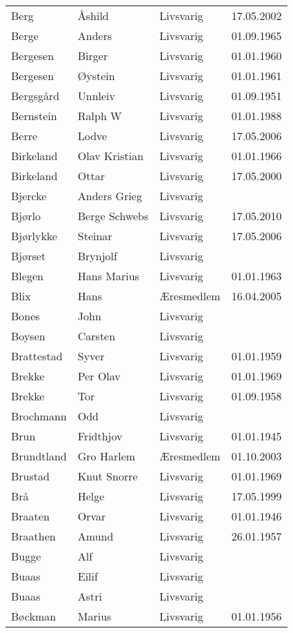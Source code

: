 \begin{longtable}{llll}
Berg 	&	Åshild	&	Livsvarig	&	17.05.2002	\\
Berge	&	Anders	&	Livsvarig 	&	01.09.1965	\\
Bergesen	&	Birger	&	Livsvarig 	&	01.01.1960	\\
Bergesen	&	Øystein	&	Livsvarig 	&	01.01.1961	\\
Bergsgård	&	Unnleiv	&	Livsvarig 	&	01.09.1951	\\
Bernstein	&	Ralph W	&	Livsvarig 	&	01.01.1988	\\
Berre	&	Lodve	&	Livsvarig	&	17.05.2006	\\
Birkeland	&	Olav Kristian	&	Livsvarig 	&	01.01.1966	\\
Birkeland	&	Ottar	&	Livsvarig	&	17.05.2000	\\
Bjercke	&	Anders Grieg	&	Livsvarig 	&		\\
Bjørlo	&	Berge Schwebs	&	Livsvarig	&	17.05.2010	\\
Bjørlykke	&	Steinar	&	Livsvarig	&	17.05.2006	\\
Bjørset	&	Brynjolf	&	Livsvarig 	&		\\
Blegen	&	Hans Marius	&	Livsvarig 	&	01.01.1963	\\
Blix	&	Hans	&	Æresmedlem	&	16.04.2005	\\
Bones	&	John	&	Livsvarig 	&		\\
Boysen	&	Carsten	&	Livsvarig 	&		\\
Brattestad	&	Syver	&	Livsvarig 	&	01.01.1959	\\
Brekke	&	Per Olav	&	Livsvarig 	&	01.01.1969	\\
Brekke	&	Tor	&	Livsvarig 	&	01.09.1958	\\
Brochmann	&	Odd	&	Livsvarig 	&		\\
Brun	&	Fridthjov	&	Livsvarig 	&	01.01.1945	\\
Brundtland 	&	Gro Harlem 	&	Æresmedlem	&	01.10.2003	\\
Brustad	&	Knut Snorre	&	Livsvarig 	&	01.01.1969	\\
Brå 	&	Helge	&	Livsvarig	&	17.05.1999	\\
Braaten	&	Orvar	&	Livsvarig 	&	01.01.1946	\\
Braathen	&	Amund	&	Livsvarig 	&	26.01.1957	\\
Bugge	&	Alf	&	Livsvarig 	&		\\
Buaas	&	Eilif	&	Livsvarig 	&		\\
Buaas	&	Astri	&	Livsvarig 	&		\\
Bøckman	&	Marius	&	Livsvarig 	&	01.01.1956	\\

\end{longtable}
